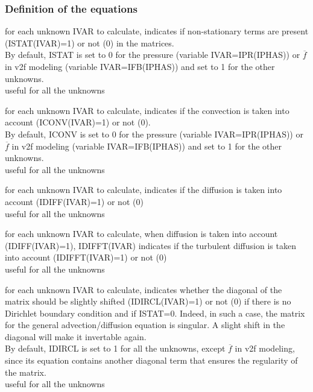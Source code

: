 \subsubsection{Definition of the equations}

{for each unknown IVAR to calculate, indicates if
non-stationary terms are present (ISTAT(IVAR)=1) or not (0) in the matrices.\\
By default, ISTAT is set to 0 for the pressure (variable IVAR=IPR(IPHAS))
or $\overline{f}$ in v2f modeling (variable IVAR=IFB(IPHAS)) and set to
1 for the other unknowns.\\
useful for all the unknowns}

{for each unknown IVAR to calculate, indicates if the
convection is taken into account (ICONV(IVAR)=1) or not (0).\\
By default, ICONV is set to 0 for the pressure (variable IVAR=IPR(IPHAS))
or $\overline{f}$ in v2f modeling (variable IVAR=IFB(IPHAS)) and set to
1 for the other unknowns.\\
useful for all the unknowns}

{for each unknown IVAR to calculate, indicates if the
diffusion is taken into account (IDIFF(IVAR)=1) or not (0)\\
useful for all the unknowns}

{for each unknown IVAR to calculate, when diffusion is taken
into account (IDIFF(IVAR)=1), IDIFFT(IVAR) indicates if the turbulent
diffusion is taken into account (IDIFFT(IVAR)=1) or not (0)\\
useful for all the unknowns }

{for each unknown IVAR to calculate, indicates whether the diagonal
of the matrix should be slightly shifted (IDIRCL(IVAR)=1) or not (0) if there
is no Dirichlet boundary condition and if ISTAT=0. Indeed, in such a case,
the matrix for the general advection/diffusion equation is singular. A slight
shift in the diagonal will make it invertable again.\\
By default, IDIRCL is set to 1 for all the unknowns, except $\overline{f}$ in
v2f modeling, since its equation contains another diagonal term that ensures
the regularity of the matrix.\\
useful for all the unknowns}

